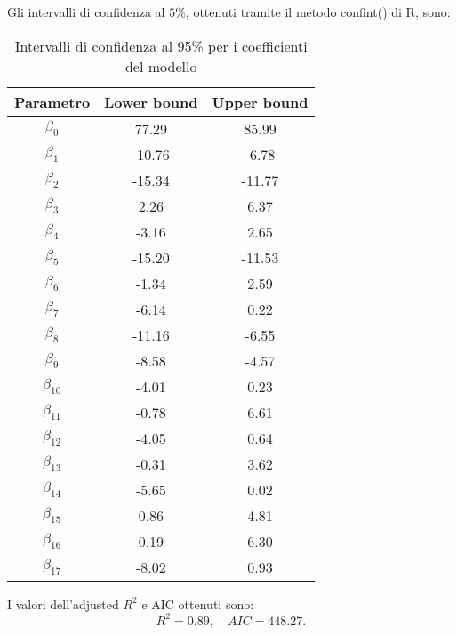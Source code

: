 Gli intervalli di confidenza al $5\%$, ottenuti tramite il metodo confint() di R, sono:
\begin{table}[H]
	\centering
	\begin{tabular}{|c|c|c|}
		\hline
		\textbf{Parametro} & \textbf{Lower bound} & \textbf{Upper bound} \\
		\hline
		$\beta_0$   & 77.29  & 85.99 \\
		$\beta_1$   & -10.76 & -6.78 \\
		$\beta_2$   & -15.34 & -11.77 \\
		$\beta_3$   & 2.26   & 6.37 \\
		$\beta_4$   & -3.16  & 2.65 \\
		$\beta_5$   & -15.20 & -11.53 \\
		$\beta_6$   & -1.34  & 2.59 \\
		$\beta_7$   & -6.14  & 0.22 \\
		$\beta_8$   & -11.16 & -6.55 \\
		$\beta_9$   & -8.58  & -4.57 \\
		$\beta_{10}$ & -4.01  & 0.23 \\
		$\beta_{11}$ & -0.78  & 6.61 \\
		$\beta_{12}$ & -4.05  & 0.64 \\
		$\beta_{13}$ & -0.31  & 3.62 \\
		$\beta_{14}$ & -5.65  & 0.02 \\
		$\beta_{15}$ & 0.86   & 4.81 \\
		$\beta_{16}$ & 0.19   & 6.30 \\
		$\beta_{17}$ & -8.02  & 0.93 \\
		\hline
	\end{tabular}
	\caption{Intervalli di confidenza al 95\% per i coefficienti del modello}
	\label{tab:ci_coefficienti}
\end{table}
I valori dell'adjusted $R^2$  e AIC ottenuti sono:
\begin{equation*}
	R^2 =      0.89, \quad AIC=448.27.
\end{equation*}

